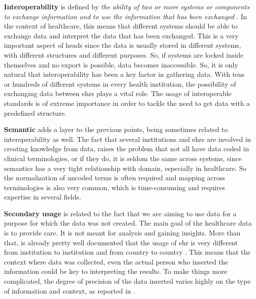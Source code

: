 \textbf{Interoperability} is defined by \textit{the ability of two or more systems or components to exchange information and to use the information that has been exchanged} \cite{182763}. In the context of healthcare, this means that different systems should be able to exchange data and interpret the data that has been exchanged. This is a very important aspect of \ac{heads} since the data is usually stored in different systems, with different structures and different purposes. So, if systems are locked inside themselves and no export is possible, data becomes inaccessible. So, it is only natural that interoperability has been a key factor in gathering data. With tens or hundreds of different systems in every health institution, the possibility of exchanging data between \acp{ehr} plays a vital role. The usage of interoperable standards is of extreme importance in order to tackle the need to get data with a predefined structure.


\textbf{Semantic} adds a layer to the previous points, being sometimes related to interoperability as well. The fact that several institutions and \acp{ehr} are involved in creating knowledge from data, raises the problem that not all have data coded in clinical terminologies, or if they do, it is seldom the same across systems, since semantics has a very tight relationship with domain, especially in healthcare. So the normalization of uncoded terms is often required and mapping across terminologies is also very common, which is time-consuming and requires expertise in several fields.



\textbf{Secondary usage} is related to the fact that we are aiming to use data for a purpose for which the data was not created. The main goal of the healthcare data is to provide care. It is not meant for analysis and gaining insights. More than that, is already pretty well documented that the usage of \ac{ehr} is very different from institution to institution and from country to country \cite{anckerHowElectronicHealth2014,weiskopfMethodsDimensionsElectronic2013a,peekThreeControversiesHealth2018}. This means that the context where data was collected, even the actual person who inserted the information could be key to interpreting the results. To make things more complicated, the degree of precision of the data inserted varies highly on the type of information and context, as reported in \cite{cruz-correiaDataQualityIntegration2009}. 



